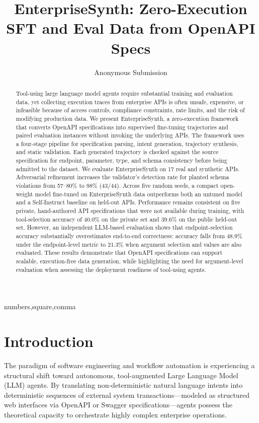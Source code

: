 \documentclass[letterpaper]{article} %
\title{EnterpriseSynth: Zero-Execution SFT and Eval Data from OpenAPI Specs}
\author{
    Anonymous Submission
}
\let\OrigBibliographystyle
\renewcommand{}[1]{}
\begin{document}
\let\OrigBibliographystyle
\setcitestyle{numbers,square,comma}


\maketitle

\begin{abstract}
Tool-using large language model agents require substantial training and evaluation data, yet
collecting execution traces from enterprise APIs is often unsafe, expensive, or infeasible because
of access controls, compliance constraints, rate limits, and the risk of modifying production
data. We present EnterpriseSynth, a zero-execution framework that converts OpenAPI specifications
into supervised fine-tuning trajectories and paired evaluation instances without invoking the
underlying APIs. The framework uses a four-stage pipeline for specification parsing, intent
generation, trajectory synthesis, and static validation. Each generated trajectory is
checked against the source specification for endpoint, parameter, type, and schema consistency
before being admitted to the dataset.
We evaluate EnterpriseSynth on 17 real and synthetic APIs. Adversarial refinement increases the
validator's detection rate for planted schema violations from 57--80\% to 98\% (43/44). Across five
random seeds, a compact open-weight model fine-tuned on EnterpriseSynth data outperforms both an
untuned model and a Self-Instruct baseline on held-out APIs. Performance remains consistent on
five private, hand-authored API specifications that were not available during training, with
tool-selection accuracy of 40.0\% on the private set and 39.6\% on the public held-out set.
However, an independent LLM-based evaluation shows that endpoint-selection accuracy substantially
overestimates end-to-end correctness: accuracy falls from 48.9\% under the endpoint-level metric
to 21.3\% when argument selection and values are also evaluated. These results demonstrate that
OpenAPI specifications can support scalable, execution-free data generation, while highlighting
the need for argument-level evaluation when assessing the deployment readiness of tool-using
agents.
\end{abstract}

\section{Introduction}
The paradigm of software engineering and workflow automation is experiencing a structural shift
toward autonomous, tool-augmented Large Language Model (LLM) agents. By translating
non-deterministic natural language intents into deterministic sequences of external system
transactions---modeled as structured web interfaces via OpenAPI or Swagger specifications---agents
possess the theoretical capacity to orchestrate highly complex enterprise operations.
\end{document}
